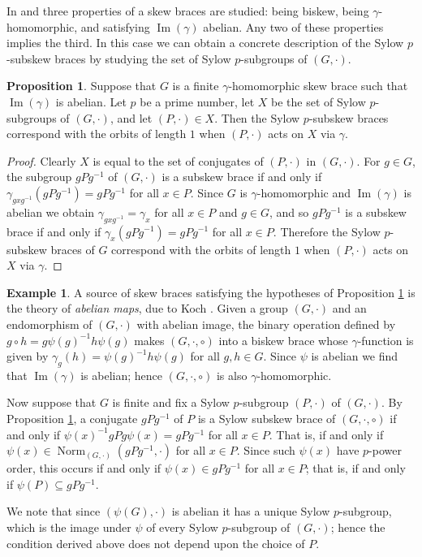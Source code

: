 \documentclass[12pt,a4paper, reqno]{amsart}
\theoremstyle{definition}
\newtheorem{proposition}[theorem]{Proposition}
\newtheorem{example}[theorem]{Example}
\DeclareMathOperator{\Norm}{\mbox{Norm}}
\DeclareMathOperator{\Ima}{\mbox{Im}}
\begin{document}
In \cite[Lemma 3.7]{Ca20} and \cite[Lemma 2.9]{ST23b} three properties of a skew braces are studied: being biskew, being $ \gamma $-homomorphic, and satisfying $ \Ima(\gamma) $ abelian. Any two of these properties implies the third. In this case we can obtain a concrete description of the Sylow $p$-subskew braces by studying the set of Sylow $ p $-subgroups of $ (G,\cdot) $.

\begin{proposition} \label{prop_counting_biskew}
Suppose that $ G $ is a finite $ \gamma $-homomorphic skew brace such that $ \Ima(\gamma) $ is abelian. Let $ p $ be a prime number, let $ X $ be the set of Sylow $ p $-subgroups of $ (G,\cdot) $, and let $ (P,\cdot) \in X $. Then the Sylow $ p $-subskew braces correspond with the orbits of length $ 1 $ when $ (P,\cdot) $ acts on $ X $ via $ \gamma $. 
\end{proposition}
\begin{proof}
Clearly $ X $ is equal to the set of conjugates of $ (P,\cdot) $ in $ (G,\cdot) $. For $ g \in G $, the subgroup $ gPg^{-1} $ of $ (G,\cdot) $ is a subskew brace if and only if $ \gamma_{gxg^{-1}}(gPg^{-1}) = gPg^{-1} $ for all $ x \in P $. Since $ G $ is $ \gamma $-homomorphic and $ \Ima(\gamma) $ is abelian we obtain $ \gamma_{gxg^{-1}} = \gamma_{x} $ for all $ x \in P $ and $ g \in G $, and so $ gPg^{-1} $ is a subskew brace if and only if $ \gamma_{x}(gPg^{-1}) = gPg^{-1} $ for all $ x \in P $. Therefore the Sylow $ p $-subskew braces of $ G $ correspond with the orbits of length $ 1 $ when $ (P,\cdot) $ acts on $ X $ via $ \gamma $. 
\end{proof}

\begin{example}
A source of skew braces satisfying the hypotheses of Proposition \ref{prop_counting_biskew} is the theory of \textit{abelian maps}, due to Koch \cite{Koc21a}. Given a group $ (G,\cdot) $ and an endomorphism of $ (G,\cdot) $ with abelian image, the binary operation defined by $ g \circ h = g\psi(g)^{-1}h\psi(g) $ makes $ (G,\cdot,\circ) $ into a biskew brace whose $ \gamma $-function is given by $ \gamma_{g}(h) = \psi(g)^{-1}h\psi(g) $ for all $ g,h \in G $. Since $ \psi $ is abelian we find that $ \Ima(\gamma) $ is abelian; hence $ (G,\cdot,\circ) $ is also $ \gamma $-homomorphic. 

Now suppose that $ G $ is finite and fix a Sylow $ p $-subgroup $ (P,\cdot) $ of $ (G,\cdot) $. By Proposition \ref{prop_counting_biskew}, a conjugate $ gPg^{-1} $ of $ P $ is a Sylow subskew brace of $ (G,\cdot,\circ) $ if and only if $ \psi(x)^{-1}gPg\psi(x) = gPg^{-1} $ for all $ x \in P $. That is, if and only if $ \psi(x) \in \Norm_{(G,\cdot)}(gPg^{-1},\cdot) $ for all $ x \in P $. Since such $ \psi(x) $ have $ p $-power order, this occurs if and only if $ \psi(x) \in gPg^{-1} $ for all $ x \in P $; that is, if and only if $ \psi(P) \subseteq gPg^{-1} $. 

We note that since $ (\psi(G),\cdot) $ is abelian it has a unique Sylow $ p $-subgroup, which is the image under $ \psi $ of every Sylow $ p $-subgroup of $ (G,\cdot) $; hence the condition derived above does not depend upon the choice of $ P $. 
\end{example}
\end{document}
